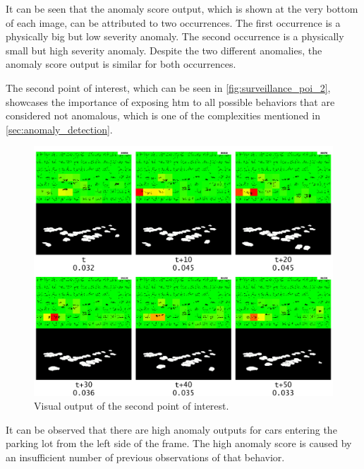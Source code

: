 It can be seen that the anomaly score output, which is shown at the very bottom of each image, can be attributed to two occurrences. The first occurrence is a physically big but low severity anomaly. The second occurrence is a physically small but high severity anomaly. Despite the two different anomalies, the anomaly score output is similar for both occurrences.
\par
The second point of interest, which can be seen in \autoref{fig:surveillance_poi_2}, showcases the importance of exposing \gls*{htm} to all possible behaviors that are considered not anomalous, which is one of the complexities mentioned in \autoref{sec:anomaly_detection}.
\begin{figure}[H]
    \centering
    \includegraphics[width=\textwidth]{resources/experiments/surveillance/surveillance_poi_2.png}
    \caption[Second POI]{Visual output of the second point of interest.}
    \label{fig:surveillance_poi_2}
\end{figure}
It can be observed that there are high anomaly outputs for cars entering the parking lot from the left side of the frame. The high anomaly score is caused by an insufficient number of previous observations of that behavior.
